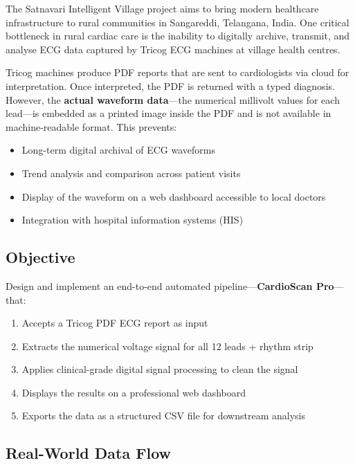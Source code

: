 \documentclass[conference]{IEEEtran}
\begin{document}
The Satnavari Intelligent Village project aims to bring modern healthcare
infrastructure to rural communities in Sangareddi, Telangana, India. One
critical bottleneck in rural cardiac care is the inability to digitally
archive, transmit, and analyse ECG data captured by Tricog ECG machines at
village health centres.

Tricog machines produce PDF reports that are sent to cardiologists via cloud
for interpretation. Once interpreted, the PDF is returned with a typed
diagnosis. However, the \textbf{actual waveform data}---the numerical
millivolt values for each lead---is embedded as a printed image inside the
PDF and is not available in machine-readable format. This prevents:

\begin{itemize}[noitemsep,topsep=2pt]
  \item Long-term digital archival of ECG waveforms
  \item Trend analysis and comparison across patient visits
  \item Display of the waveform on a web dashboard accessible to local doctors
  \item Integration with hospital information systems (HIS)
\end{itemize}

\subsection{Objective}

Design and implement an end-to-end automated pipeline---\textbf{CardioScan
Pro}---that:

\begin{enumerate}[noitemsep,topsep=2pt]
  \item Accepts a Tricog PDF ECG report as input
  \item Extracts the numerical voltage signal for all 12 leads + rhythm strip
  \item Applies clinical-grade digital signal processing to clean the signal
  \item Displays the results on a professional web dashboard
  \item Exports the data as a structured CSV file for downstream analysis
\end{enumerate}

\subsection{Real-World Data Flow}
\end{document}
